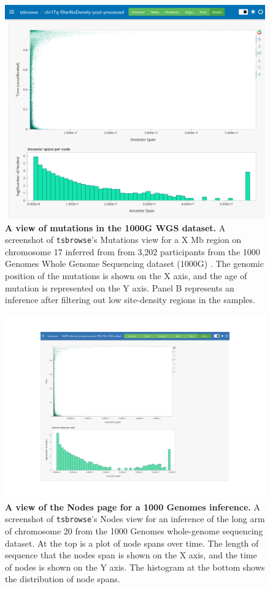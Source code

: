 \documentclass[unnumsec,webpdf,contemporary,large,namedate]{oup-authoring-template}%
\begin{document}
\begin{figure}
    \centering
    \includegraphics[width=0.95\linewidth]{manuscript/figures/SuppFig2.png}
    \caption{\textbf{A view of mutations in the 1000G WGS dataset.}
    A screenshot of \texttt{tsbrowse}'s Mutations view for a X Mb region on chromosome 17 inferred from from 3,202 participants from the 1000 Genomes Whole Genome Sequencing dataset (1000G) \citep{1000G2015, 1000GWGS}. The genomic position of the mutations is shown on the X axis, and the age of mutation is represented on the Y axis. Panel B represents an inference after filtering out low site-density regions in the samples.}
    \label{fig:Supplementary_Figure_2}
\end{figure}

\begin{figure}
    \centering
    \includegraphics[width=0.95\linewidth]{manuscript/figures/SuppFig3.png}
    \caption{\textbf{A view of the Nodes page for a 1000 Genomes inference.}
    A screenshot of \texttt{tsbrowse}'s Nodes view for an inference of the long arm of chromosome 20 from the 1000 Genomes whole-genome sequencing dataset. At the top is a plot of node spans over time. The length of sequence that the nodes span is shown on the X axis, and the time of nodes is shown on the Y axis. The histogram at the bottom shows the distribution of node spans. }
    \label{fig:Supplementary_Figure_3}
\end{figure}
\end{document}
